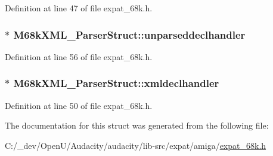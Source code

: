 Definition at line 47 of file expat\+\_\+68k.\+h.

\subsubsection[{\texorpdfstring{unparseddeclhandler}{unparseddeclhandler}}]{$\ast$ M68k\+X\+M\+L\+\_\+\+Parser\+Struct\+::unparseddeclhandler}\hypertarget{struct_m68k_x_m_l___parser_struct_aeb07cf8c037430434f378c82df2b4417}{}\label{struct_m68k_x_m_l___parser_struct_aeb07cf8c037430434f378c82df2b4417}


Definition at line 56 of file expat\+\_\+68k.\+h.

\subsubsection[{\texorpdfstring{xmldeclhandler}{xmldeclhandler}}]{$\ast$ M68k\+X\+M\+L\+\_\+\+Parser\+Struct\+::xmldeclhandler}\hypertarget{struct_m68k_x_m_l___parser_struct_ad44ea4f0871f28cffe05d93f18fbe76f}{}\label{struct_m68k_x_m_l___parser_struct_ad44ea4f0871f28cffe05d93f18fbe76f}


Definition at line 50 of file expat\+\_\+68k.\+h.



The documentation for this struct was generated from the following file\+:\begin{DoxyCompactItemize}
\item 
C\+:/\+\_\+dev/\+Open\+U/\+Audacity/audacity/lib-\/src/expat/amiga/\hyperlink{expat__68k_8h}{expat\+\_\+68k.\+h}\end{DoxyCompactItemize}
